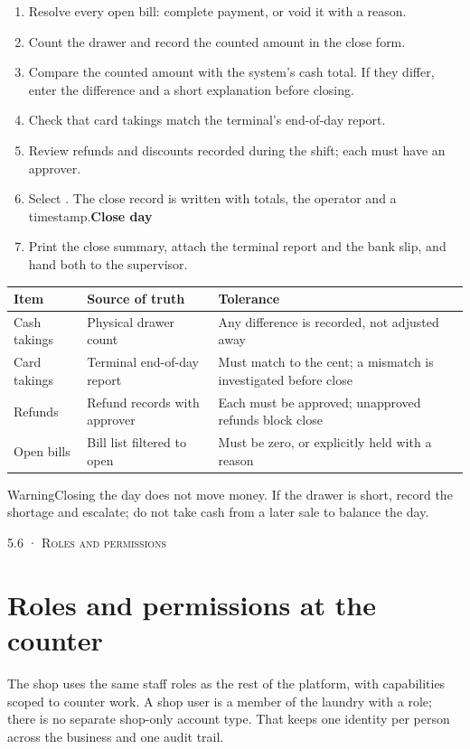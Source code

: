 \documentclass[11pt,a4paper,oneside]{book}
\begin{document}
\begin{enumerate}
\item Resolve every open bill: complete payment, or void it with a reason.
\item Count the drawer and record the counted amount in the close form.
\item Compare the counted amount with the system's cash total. If they differ, enter the difference and a short explanation before closing.
\item Check that card takings match the terminal's end-of-day report.
\item Review refunds and discounts recorded during the shift; each must have an approver.
\item Select . The close record is written with totals, the operator and a timestamp.\textbf{Close day}
\item Print the close summary, attach the terminal report and the bank slip, and hand both to the supervisor.
\end{enumerate}
\begin{center}\small
\begin{tabularx}{\linewidth}{|X|X|X|}
\hline
\rowcolor{lightgrey}
\textbf{Item} & \textbf{Source of truth} & \textbf{Tolerance} \\ \hline
Cash takings & Physical drawer count & Any difference is recorded, not adjusted away \\ \hline
Card takings & Terminal end-of-day report & Must match to the cent; a mismatch is investigated before close \\ \hline
Refunds & Refund records with approver & Each must be approved; unapproved refunds block close \\ \hline
Open bills & Bill list filtered to open & Must be zero, or explicitly held with a reason \\ \hline
\end{tabularx}
\end{center}
\begin{notebox}WarningClosing the day does not move money. If the drawer is short, record the shortage and escalate; do not take cash from a later sale to balance the day.\end{notebox}
\textsc{\small\color{crimson}5.6 · Roles and permissions}\par\medskip
\section*{Roles and permissions at the counter}
The shop uses the same staff roles as the rest of the platform, with capabilities scoped to counter work. A shop user is a member of the laundry with a role; there is no separate shop-only account type. That keeps one identity per person across the business and one audit trail.
\end{document}
